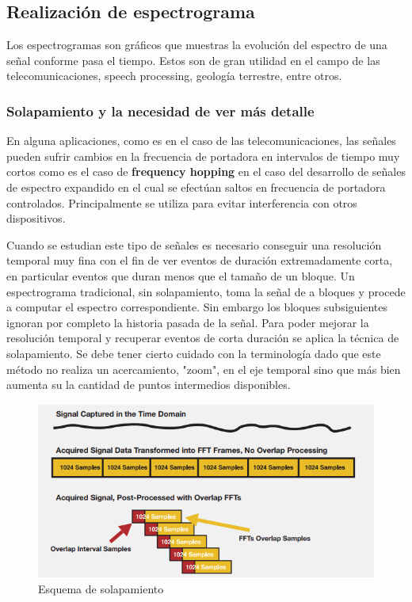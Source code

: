 



\subsection{Realización de espectrograma}

Los espectrogramas son gráficos que muestras la evolución del espectro de una señal conforme pasa el tiempo. Estos son de gran utilidad en el campo de las telecomunicaciones, speech processing, geología terrestre, entre otros.

\subsubsection{Solapamiento y la necesidad de ver más detalle}
En alguna aplicaciones, como es en el caso de las telecomunicaciones, las señales pueden sufrir cambios en la frecuencia de portadora en intervalos de tiempo muy cortos como es el caso de \textbf{frequency hopping} en el caso del desarrollo de señales de espectro expandido en el cual se efectúan saltos en frecuencia de portadora controlados. Principalmente se utiliza para evitar interferencia con otros dispositivos.

Cuando se estudian este tipo de señales es necesario conseguir una resolución temporal muy fina con el fin de ver eventos de duración extremadamente corta, en particular eventos que duran menos que el tamaño de un bloque. Un espectrograma tradicional, sin solapamiento, toma la señal de a bloques y procede a computar el espectro correspondiente. Sin embargo los bloques subsiguientes ignoran por completo la historia pasada de la señal. Para poder mejorar la resolución temporal y recuperar eventos de corta duración se aplica la técnica de solapamiento. Se debe tener cierto cuidado con la terminología dado que este método no realiza un acercamiento, "zoom", en el eje temporal sino que más bien aumenta su la cantidad de puntos intermedios disponibles. 
  
\begin{figure}[H]
	\centering
	\includegraphics[width=0.7\linewidth]{ImagenesEjercicio7/OverlapDiagram}
	\caption{Esquema de solapamiento}
	\label{fig:overlapdiagram}
\end{figure}

